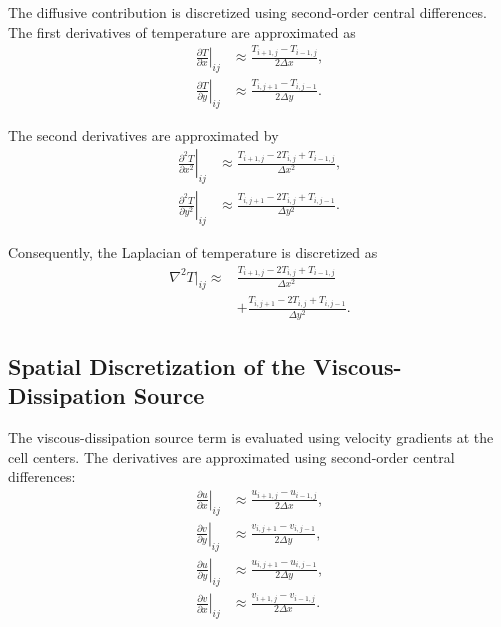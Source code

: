 The diffusive contribution is discretized using second-order
central differences. The first derivatives of temperature are
approximated as
\begin{align}
\left.\frac{\partial T}{\partial x}\right|_{ij}
&\approx
\frac{T_{i+1,j}-T_{i-1,j}}{2\Delta x},
\\
\left.\frac{\partial T}{\partial y}\right|_{ij}
&\approx
\frac{T_{i,j+1}-T_{i,j-1}}{2\Delta y}.
\end{align}

The second derivatives are approximated by
\begin{align}
\left.\frac{\partial^2 T}{\partial x^2}\right|_{ij}
&\approx
\frac{T_{i+1,j}-2T_{i,j}+T_{i-1,j}}{\Delta x^2},
\label{eq:second_derivative_x}
\\
\left.\frac{\partial^2 T}{\partial y^2}\right|_{ij}
&\approx
\frac{T_{i,j+1}-2T_{i,j}+T_{i,j-1}}{\Delta y^2}.
\label{eq:second_derivative_y}
\end{align}

Consequently, the Laplacian of temperature is discretized as
\begin{equation}
\begin{aligned}
\nabla^2 T\big|_{ij}
\approx{}&
\frac{T_{i+1,j}-2T_{i,j}+T_{i-1,j}}{\Delta x^2}
\\
&+
\frac{T_{i,j+1}-2T_{i,j}+T_{i,j-1}}{\Delta y^2}.
\end{aligned}
\label{eq:discrete_laplacian}
\end{equation}

\subsection{Spatial Discretization of the Viscous-Dissipation Source}

The viscous-dissipation source term is evaluated using
velocity gradients at the cell centers. The derivatives are
approximated using second-order central differences:
\begin{align}
\left.\frac{\partial u}{\partial x}\right|_{ij}
&\approx
\frac{u_{i+1,j}-u_{i-1,j}}{2\Delta x},
\\
\left.\frac{\partial v}{\partial y}\right|_{ij}
&\approx
\frac{v_{i,j+1}-v_{i,j-1}}{2\Delta y},
\\
\left.\frac{\partial u}{\partial y}\right|_{ij}
&\approx
\frac{u_{i,j+1}-u_{i,j-1}}{2\Delta y},
\\
\left.\frac{\partial v}{\partial x}\right|_{ij}
&\approx
\frac{v_{i+1,j}-v_{i-1,j}}{2\Delta x}.
\end{align}

